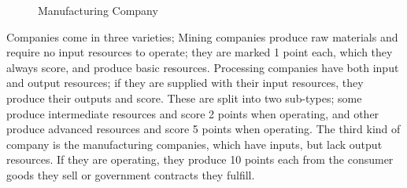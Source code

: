 \documentclass[]{article}
\begin{document}
\begin{figure}[h]
\begin{minipage}{.3\textwidth}
  Manufacturing Company
\end{minipage}
\end{figure}
Companies come in three varieties; Mining companies produce raw materials and require no input resources to operate; they are marked 1 point each, which they always score, and produce basic resources. Processing companies have both input and output resources; if they are supplied with their input resources, they produce their outputs and score. These are split into two sub-types; some produce intermediate resources and score 2 points when operating, and other produce advanced resources and score 5 points when operating. The third kind of company is the manufacturing companies, which have inputs, but lack output resources. If they are operating, they produce 10 points each from the consumer goods they sell or government contracts they fulfill.
\end{document}
